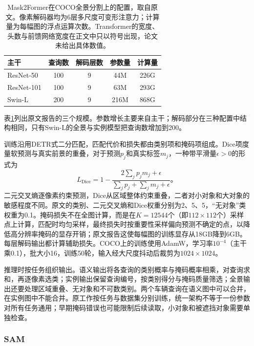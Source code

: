 \begin{table}[htbp]
 \centering
 \small
 \begin{tabular}{@{}lcccc@{}}
 \toprule
 主干 & 查询数 & 解码层数 & 参数量 & 计算量\\
 \midrule
 ResNet-50 & 100 & 9 & 44M & 226G\\
 ResNet-101 & 100 & 9 & 63M & 293G\\
 Swin-L & 200 & 9 & 216M & 868G\\
 \bottomrule
 \end{tabular}
 \caption{Mask2Former在COCO全景分割上的配置，取自原文。像素解码器均为6层多尺度可变形注意力；计算量为每幅图的浮点运算次数。Transformer的宽度、头数与前馈网络宽度在正文中只以符号出现，论文未给出具体数值。}
 \label{tab:vision-recognition-mask2former-config}
\end{table}

表\ref{tab:vision-recognition-mask2former-config}列出原文报告的三个规模。参数增长主要来自主干；解码部分在三种配置中结构相同，只有Swin-L的全景与实例模型把查询数增加到200。

训练沿用DETR式二分匹配，匹配代价和损失都由类别项和掩码项组成。Dice项度量软预测与真实前景的重叠，对于预测$p_j$和真实标签$m_j$，一种带平滑量$\epsilon>0$的形式为
\begin{equation}
 L_{\mathrm{Dice}}=
 1-\frac{2\sum_j p_jm_j+\epsilon}
 {\sum_j p_j+\sum_j m_j+\epsilon}\text{。}
 \label{eq:vision-dice}
\end{equation}
二元交叉熵逐像素约束预测，Dice从区域整体约束重叠，二者对小对象和大对象的敏感程度不同。原文的类别、二元交叉熵和Dice权重分别为2、5、5，“无对象”类权重为0.1。掩码损失不在全图计算，而是在$K=12544$个（即$112\times112$个）采样点上计算，匹配时均匀采样，最终损失时按重要性采样偏向预测不确定的点，以降低高分辨率掩码的显存开销；原文报告这使每幅图的训练显存从18GB降到6GB。每层解码输出都计算辅助损失。COCO上的训练使用AdamW，学习率$10^{-4}$（主干乘0.1），批大小16，训练50轮，输入经大尺度抖动后裁剪为$1024\times1024$。

推理时按任务组织输出。语义输出将各查询的类别概率与掩码概率相乘，对查询求和，再逐像素选类；实例输出保留查询编号，按类别得分与掩码质量筛选；全景输出还要处理区域重叠、无对象和不可数类别。两个车辆查询在语义图中可以合并，在实例图中不能合并。原工作按任务与数据集分别训练，统一架构不等于一份参数对所有任务通用；早期掩码错误也可能限制后续读取，小对象和被遮挡对象需要单独检查。

\subsubsection{SAM}
\label{sec:vision-recognition-sam}

